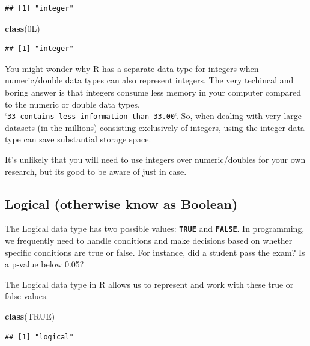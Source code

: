 \documentclass[
]{book}
\newenvironment{Shaded}{\begin{snugshade}}{\end{snugshade}}
\newcommand{\ConstantTok}[1]{\textcolor[rgb]{0.56,0.35,0.01}{#1}}
\newcommand{\FunctionTok}[1]{\textcolor[rgb]{0.13,0.29,0.53}{\textbf{#1}}}
\newcommand{\NormalTok}[1]{#1}
\begin{document}
\begin{verbatim}
## [1] "integer"
\end{verbatim}

\begin{Shaded}
\begin{Highlighting}[]
\FunctionTok{class}\NormalTok{(0L)}
\end{Highlighting}
\end{Shaded}

\begin{verbatim}
## [1] "integer"
\end{verbatim}

You might wonder why R has a separate data type for integers when numeric/double data types can also represent integers. The very techincal and boring answer is that integers consume less memory in your computer compared to the numeric or double data types. `\texttt{33\ contains\ less\ information\ than\ 33.00}`. So, when dealing with very large datasets (in the millions) consisting exclusively of integers, using the integer data type can save substantial storage space.

It's unlikely that you will need to use integers over numeric/doubles for your own research, but its good to be aware of just in case.

\hypertarget{logical-otherwise-know-as-boolean}{%
\subsection{Logical (otherwise know as Boolean)}\label{logical-otherwise-know-as-boolean}}

The Logical data type has two possible values: \textbf{\texttt{TRUE}} and \textbf{\texttt{FALSE}}. In programming, we frequently need to handle conditions and make decisions based on whether specific conditions are true or false. For instance, did a student pass the exam? Is a p-value below 0.05?

The Logical data type in R allows us to represent and work with these true or false values.

\begin{Shaded}
\begin{Highlighting}[]
\FunctionTok{class}\NormalTok{(}\ConstantTok{TRUE}\NormalTok{)}
\end{Highlighting}
\end{Shaded}

\begin{verbatim}
## [1] "logical"
\end{verbatim}
\end{document}
